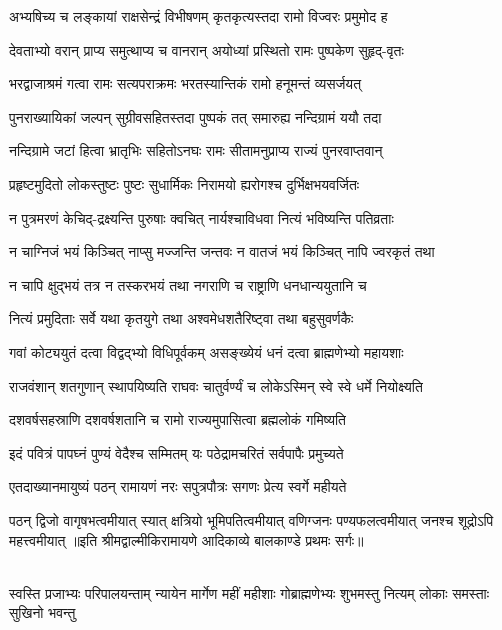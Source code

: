 \twolineshloka
{अभ्यषिच्य च लङ्कायां राक्षसेन्द्रं विभीषणम्}
{कृतकृत्यस्तदा रामो विज्वरः प्रमुमोद ह}%

\twolineshloka
{देवताभ्यो वरान् प्राप्य समुत्थाप्य च वानरान्}
{अयोध्यां प्रस्थितो रामः पुष्पकेण सुहृद्-वृतः}%

\twolineshloka
{भरद्वाजाश्रमं गत्वा रामः सत्यपराक्रमः}
{भरतस्यान्तिकं रामो हनूमन्तं व्यसर्जयत्}%

\twolineshloka
{पुनराख्यायिकां जल्पन् सुग्रीवसहितस्तदा}
{पुष्पकं तत् समारुह्य नन्दिग्रामं ययौ तदा}%

\twolineshloka
{नन्दिग्रामे जटां हित्वा भ्रातृभिः सहितोऽनघः}
{रामः सीतामनुप्राप्य राज्यं पुनरवाप्तवान्}%

\twolineshloka
{प्रहृष्टमुदितो लोकस्तुष्टः पुष्टः सुधार्मिकः}
{निरामयो ह्यरोगश्च दुर्भिक्षभयवर्जितः}%

\twolineshloka
{न पुत्रमरणं केचिद्-द्रक्ष्यन्ति पुरुषाः क्वचित्}
{नार्यश्चाविधवा नित्यं भविष्यन्ति पतिव्रताः}%

\twolineshloka
{न चाग्निजं भयं किञ्चित् नाप्सु मज्जन्ति जन्तवः}
{न वातजं भयं किञ्चित् नापि ज्वरकृतं तथा}%

\twolineshloka
{न चापि क्षुद्भयं तत्र न तस्करभयं तथा}
{नगराणि च राष्ट्राणि धनधान्ययुतानि च}%

\twolineshloka
{नित्यं प्रमुदिताः सर्वे यथा कृतयुगे तथा}
{अश्वमेधशतैरिष्ट्वा तथा बहुसुवर्णकैः}%

\twolineshloka
{गवां कोट्ययुतं दत्वा विद्वद्‌भ्यो विधिपूर्वकम्}
{असङ्ख्येयं धनं दत्वा ब्राह्मणेभ्यो महायशाः}%

\twolineshloka
{राजवंशान् शतगुणान् स्थापयिष्यति राघवः}
{चातुर्वर्ण्यं च लोकेऽस्मिन् स्वे स्वे धर्मे नियोक्ष्यति}%

\twolineshloka
{दशवर्षसहस्राणि दशवर्षशतानि च}
{रामो राज्यमुपासित्वा ब्रह्मलोकं गमिष्यति}%

\twolineshloka
{इदं पवित्रं पापघ्नं पुण्यं वेदैश्च सम्मितम्}
{यः पठेद्रामचरितं सर्वपापैः प्रमुच्यते}%

\twolineshloka
{एतदाख्यानमायुष्यं पठन् रामायणं नरः}
{सपुत्रपौत्रः सगणः प्रेत्य स्वर्गे महीयते}%

\fourlineindentedshloka
{पठन् द्विजो वागृषभत्वमीयात्}
{स्यात् क्षत्रियो भूमिपतित्वमीयात्}
{वणिग्जनः पण्यफलत्वमीयात्}
{जनश्च शूद्रोऽपि महत्त्वमीयात्}%
{॥इति श्रीमद्वाल्मीकिरामायणे आदिकाव्ये बालकाण्डे प्रथमः सर्गः॥}

\mbox{}\\
\resetShloka
{}
\fourlineindentedshloka
{स्वस्ति प्रजाभ्यः परिपालयन्ताम्}
{न्यायेन मार्गेण महीं महीशाः}
{गोब्राह्मणेभ्यः शुभमस्तु नित्यम्}
{लोकाः समस्ताः सुखिनो भवन्तु}

